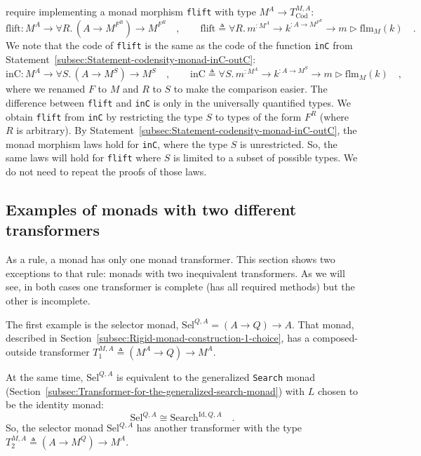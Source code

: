 require implementing a monad morphism \lstinline!flift! with type
$M^{A}\rightarrow T_{\text{Cod}}^{M,A}$:
\[
\text{flift}:M^{A}\rightarrow\forall R.\,(A\rightarrow M^{F^{R}})\rightarrow M^{F^{R}}\quad,\quad\quad\text{flift}\triangleq\forall R.\,m^{:M^{A}}\rightarrow k^{:A\rightarrow M^{F^{R}}}\rightarrow m\triangleright\text{flm}_{M}(k)\quad.
\]
We note that the code of \lstinline!flift! is the same as the code
of the function \lstinline!inC! from Statement~\ref{subsec:Statement-codensity-monad-inC-outC}:
\[
\text{inC}:M^{A}\rightarrow\forall S.\,(A\rightarrow M^{S})\rightarrow M^{S}\quad,\quad\quad\text{inC}\triangleq\forall S.\,m^{:M^{A}}\rightarrow k^{:A\rightarrow M^{S}}\rightarrow m\triangleright\text{flm}_{M}(k)\quad,
\]
where we renamed $F$ to $M$ and $R$ to $S$ to make the comparison
easier. The difference between \lstinline!flift! and \lstinline!inC!
is only in the universally quantified types. We obtain \lstinline!flift!
from \lstinline!inC! by restricting the type $S$ to types of the
form $F^{R}$ (where $R$ is arbitrary). By Statement~\ref{subsec:Statement-codensity-monad-inC-outC},
the monad morphism laws hold for \lstinline!inC!, where the type
$S$ is unrestricted. So, the same laws will hold for \lstinline!flift!
where $S$ is limited to a subset of possible types. We do not need
to repeat the proofs of those laws.

\subsection{Examples of monads with two different transformers\label{subsec:Examples-of-monads-with-two-different-transformers}}

As a rule, a monad has only one monad transformer. This section shows
two exceptions to that rule: monads with two inequivalent transformers.
As we will see, in both cases one transformer is complete (has all
required methods) but the other is incomplete.

The first example is the selector monad,
$\text{Sel}^{Q,A}=(A\rightarrow Q)\rightarrow A$. That monad, described
in Section~\ref{subsec:Rigid-monad-construction-1-choice}, has a
composed-outside transformer $T_{1}^{M,A}\triangleq(M^{A}\rightarrow Q)\rightarrow M^{A}$. 

At the same time, $\text{Sel}^{Q,A}$ is equivalent to the generalized
\lstinline!Search! monad (Section~\ref{subsec:Transformer-for-the-generalized-search-monad})
with $L$ chosen to be the identity monad:
\[
\text{Sel}^{Q,A}\cong\text{Search}^{\text{Id},Q,A}\quad.
\]
So, the selector monad $\text{Sel}^{Q,A}$ has another transformer
with the type $T_{2}^{M,A}\triangleq(A\rightarrow M^{Q})\rightarrow M^{A}$. 


